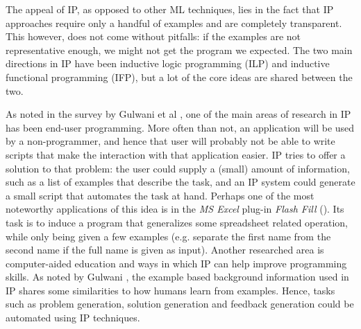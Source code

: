 \par The appeal of IP,  as opposed to other ML techniques, lies in the fact that IP approaches require only a handful of examples and are completely transparent. This however, does not come without pitfalls: if the examples are not representative enough, we might not get the program we expected. The two main directions in IP have been inductive logic programming (ILP) and inductive functional programming (IFP), but a lot of the core ideas are shared between the two. 
\par As noted in the survey by Gulwani et al \cite{gulwanietal}, one of the main areas of research in IP has been end-user programming. More often than not, an application will be used by a non-programmer, and hence that user will probably not be able to write scripts that make the interaction with that application easier. IP tries to offer a solution to that problem: the user could supply a (small) amount of information, such as a list of examples that describe the task, and an IP system could generate a small script that automates the task at hand. Perhaps one of the most noteworthy applications of this idea is in the \textit{MS Excel} plug-in \textit{Flash Fill} (\cite{gulwani2012spreadsheet}). Its task is to induce a program that generalizes some spreadsheet related operation, while only being given a few examples (e.g. separate the first name from the second name if the full name is given as input). Another researched area is computer-aided education and ways in which IP can help improve programming skills. As noted by Gulwani \cite{gulwanistem}, the example based background information used in IP shares some similarities to how humans learn from examples. Hence, tasks such as problem generation, solution generation and feedback generation could be automated using IP techniques.

